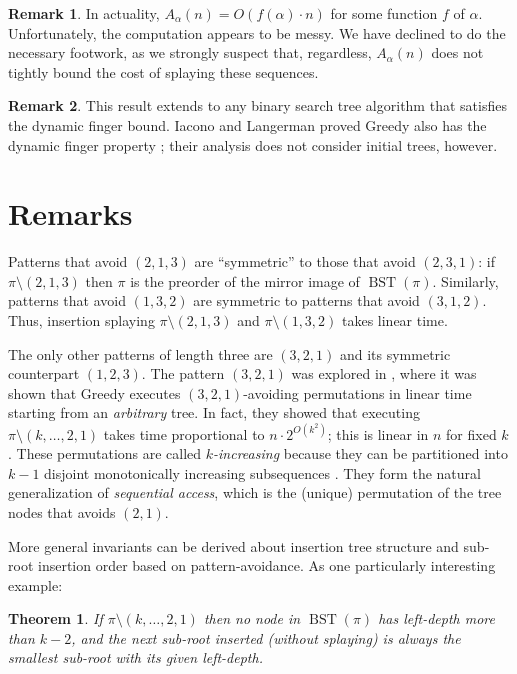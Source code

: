 \documentclass{article}
\theoremstyle{plain}
\newtheorem{theorem}{Theorem}
\theoremstyle{definition}
\newtheorem{remark}{Remark}
\DeclareMathOperator{\BST}{BST}  %
\begin{document}
%
\begin{remark}
In actuality, $A_\alpha(n)=O(f(\alpha)\cdot n)$ for some function $f$ of
$\alpha$. Unfortunately, the computation appears to be messy. We have declined
to do the necessary footwork, as we strongly suspect that, regardless,
$A_\alpha(n)$ does not tightly bound the cost of splaying these sequences.
\end{remark}

\begin{remark}
This result extends to any binary search tree algorithm that satisfies the
dynamic finger bound. Iacono and Langerman proved Greedy also has the dynamic
finger property \cite{GREEDY_DYNAMIC_FINGER}; their analysis does not
consider initial trees, however.
\end{remark}


\section{Remarks}\label{sec:GeneralPatterns}

%
Patterns that avoid $(2,1,3)$ are ``symmetric'' to those that avoid $(2,3,1)$:
if $\pi\setminus(2,1,3)$ then $\pi$ is the preorder of the mirror image of
$\BST(\pi)$. Similarly, patterns that avoid $(1,3,2)$ are symmetric to patterns
that avoid $(3,1,2)$. Thus, insertion splaying $\pi\setminus(2,1,3)$ and
$\pi\setminus(1,3,2)$ takes linear time.

%
The only other patterns of length three are $(3,2,1)$ and its symmetric
counterpart $(1,2,3)$. The pattern $(3,2,1)$ was explored in
\cite{PATTERN_AVOIDANCE}, where it was shown that Greedy executes
$(3,2,1)$-avoiding permutations in linear time starting from an
\emph{arbitrary} tree. In fact, they showed that executing
$\pi\setminus(k,\dots,2,1)$ takes time proportional to $n\cdot 2^{O(k^2)}$;
this is linear in $n$ for fixed $k$. These permutations are called
\emph{$k$-increasing} because they can be partitioned into $k-1$ disjoint
monotonically increasing subsequences \cite{PATTERN_AVOIDANCE}. They form the
natural generalization of \emph{sequential access}, which is the (unique)
permutation of the tree nodes that avoids $(2,1)$.


%
More general invariants can be derived about insertion tree structure and
sub-root insertion order based on pattern-avoidance. As one particularly
interesting example:

%
\begin{theorem}
If $\pi\setminus(k,\dots,2,1)$ then no node in $\BST(\pi)$ has left-depth more
than $k-2$, and the next sub-root inserted (without splaying) is always the
smallest sub-root with its given left-depth.
\end{theorem}
\end{document}

